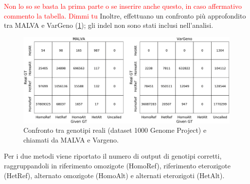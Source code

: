 \documentclass[../main.tex]{subfiles}
\begin{document}
\noindent
\textcolor{red}{Non lo so se basta la prima parte o se inserire anche questo, in caso affermativo commento la tabella. Dimmi tu}
Inoltre, \cite{bernardini2019malva} effettuano un confronto più approfondito tra MALVA e VarGeno (\ref{fig:confronto3}); gli indel non sono stati inclusi nell'analisi.

\begin{figure}[h!]
	\centering
  	\captionsetup{justification=centering}
  	\includegraphics{images/confronto3.jpg}
  	\caption{Confronto tra genotipi reali (dataset 1000 Genome Project) e chiamati da MALVA e Vargeno.}
  	\label{fig:confronto3}
\end{figure}


Per i due metodi viene riportato il numero di output di genotipi corretti, raggruppandoli in riferimento omozigote (HomoRef), riferimento eterozigote (HetRef), alternato omozigote (HomoAlt) e alternati eterozigoti (HetAlt). 
\end{document}
